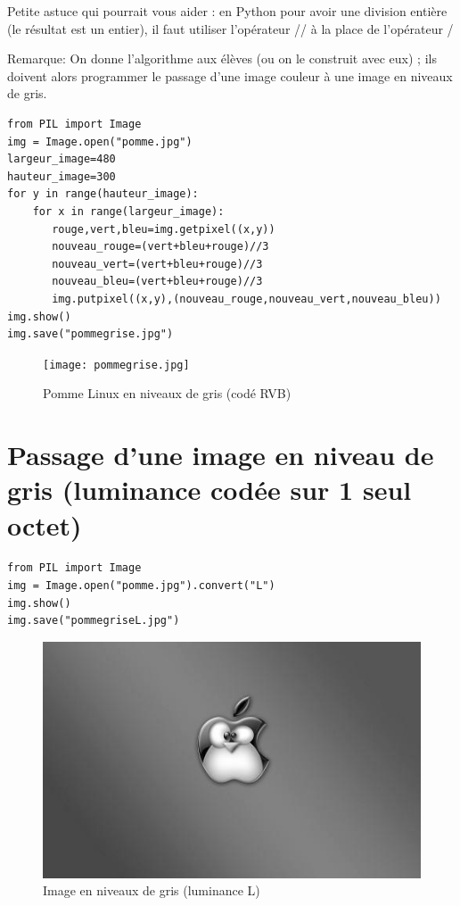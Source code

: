 \documentclass[11pt]{article}
\begin{document}
Petite astuce qui pourrait vous aider : en Python pour avoir une division entière (le résultat est un entier), il faut utiliser l'opérateur // à la place de l'opérateur / 

Remarque: On donne l'algorithme aux élèves (ou on le construit avec eux) ; ils doivent alors programmer le passage d'une image couleur à une image en niveaux de gris.


\begin{verbatim}
from PIL import Image
img = Image.open("pomme.jpg")
largeur_image=480
hauteur_image=300
for y in range(hauteur_image):
    for x in range(largeur_image):
       rouge,vert,bleu=img.getpixel((x,y))
       nouveau_rouge=(vert+bleu+rouge)//3
       nouveau_vert=(vert+bleu+rouge)//3
       nouveau_bleu=(vert+bleu+rouge)//3
       img.putpixel((x,y),(nouveau_rouge,nouveau_vert,nouveau_bleu))
img.show()
img.save("pommegrise.jpg")
\end{verbatim}

\begin{figure}[htbp]
\centering
\texttt{[image: pommegrise.jpg]}
\caption{Pomme Linux en niveaux de gris (codé RVB)}
\end{figure}


\section{Passage d'une image en niveau de gris (luminance codée sur 1 seul octet)}
\label{sec:org23192ac}

\begin{verbatim}
from PIL import Image
img = Image.open("pomme.jpg").convert("L")
img.show()
img.save("pommegriseL.jpg")
\end{verbatim}


\begin{figure}[htbp]
\centering
\includegraphics[width=.9\linewidth]{pommegriseL.jpg}
\caption{Image en niveaux de gris (luminance L)}
\end{figure}
\end{document}
